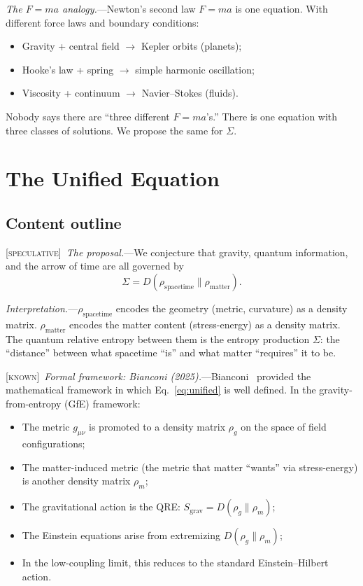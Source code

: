 \documentclass[prl,twocolumn,superscriptaddress,longbibliography,floatfix]{revtex4-2}
\newcommand{\known}{\textsc{[known]}}
\newcommand{\spec}{\textsc{[speculative]}}
\begin{document}
\emph{The $F = ma$ analogy.}---Newton's second law $F = ma$ is one
equation. With different force laws and boundary conditions:
\begin{itemize}
\item Gravity + central field $\to$ Kepler orbits (planets);
\item Hooke's law + spring $\to$ simple harmonic oscillation;
\item Viscosity + continuum $\to$ Navier--Stokes (fluids).
\end{itemize}
Nobody says there are ``three different $F = ma$'s.'' There is
one equation with three classes of solutions. We propose the same
for $\Sigma$.

\section{The Unified Equation}
\label{sec:unified}

\subsection*{Content outline}

\spec\ \emph{The proposal.}---We conjecture that gravity, quantum
information, and the arrow of time are all governed by
\begin{equation}
\boxed{
\Sigma = D(\rho_{\mathrm{spacetime}} \| \rho_{\mathrm{matter}}).
}
\label{eq:unified}
\end{equation}

\emph{Interpretation.}---$\rho_{\mathrm{spacetime}}$ encodes the
geometry (metric, curvature) as a density matrix.
$\rho_{\mathrm{matter}}$ encodes the matter content (stress-energy)
as a density matrix. The quantum relative entropy between them is
the entropy production $\Sigma$: the ``distance'' between what
spacetime ``is'' and what matter ``requires'' it to be.

\known\ \emph{Formal framework: Bianconi (2025).}---Bianconi~\cite{Bianconi2025}
provided the mathematical framework in which
Eq.~\eqref{eq:unified} is well defined. In the gravity-from-entropy
(GfE) framework:
\begin{itemize}
\item The metric $g_{\mu\nu}$ is promoted to a density matrix
  $\rho_g$ on the space of field configurations;
\item The matter-induced metric (the metric that matter ``wants''
  via stress-energy) is another density matrix $\rho_m$;
\item The gravitational action is the QRE:
  $S_{\mathrm{grav}} = D(\rho_g \| \rho_m)$;
\item The Einstein equations arise from extremizing $D(\rho_g \| \rho_m)$;
\item In the low-coupling limit, this reduces to the standard
  Einstein--Hilbert action.
\end{itemize}
\end{document}
